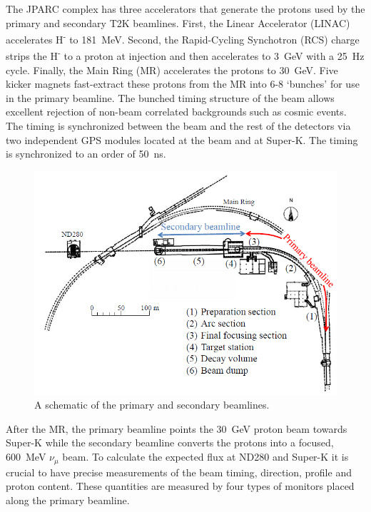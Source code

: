 The JPARC complex has three accelerators that generate the
protons used by the primary and secondary T2K beamlines. First, the
Linear Accelerator (LINAC) accelerates H\textsuperscript{-} to
181~MeV. Second, the Rapid-Cycling Synchotron (RCS) charge strips the
H\textsuperscript{-} to a proton at injection and then accelerates to
3~GeV with a 25~Hz cycle. Finally, the Main Ring (MR) accelerates the
protons to 30~GeV. Five kicker magnets fast-extract these protons from
the MR into 6-8 `bunches' for use in the primary beamline. The bunched
timing structure of the beam allows excellent rejection of non-beam
correlated backgrounds such as cosmic events. The timing is
synchronized between the beam and the rest of the detectors via two
independent GPS modules located at the beam and at Super-K. The timing
is synchronized to an order of 50~ns.

\begin{figure}
\begin{center}
\includegraphics[width=6in]{./Figures/beam1.png}
\end{center}
\caption{A schematic of the primary and secondary beamlines.}
\label{fig:beam1}
\end{figure}

After the MR, the primary beamline points the 30~GeV proton beam towards Super-K while the secondary beamline converts the protons into a focused, 600~MeV $\nu_\mu$ beam. To calculate the expected flux at ND280 and Super-K it is crucial to have precise measurements of the beam timing, direction, profile and proton content. These quantities are measured by four types of monitors placed along the primary beamline.

